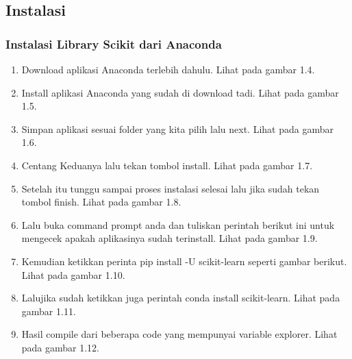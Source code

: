 \subsection{Instalasi}
\subsubsection{Instalasi Library Scikit dari Anaconda}
\begin{enumerate}
\item Download aplikasi Anaconda terlebih dahulu. Lihat pada gambar 1.4.
\item Install aplikasi Anaconda yang sudah di download tadi. Lihat pada gambar 1.5.
\item Simpan aplikasi sesuai folder yang kita pilih lalu next. Lihat pada gambar 1.6.
\item Centang Keduanya lalu tekan tombol install. Lihat pada gambar 1.7.
\item Setelah itu tunggu sampai proses instalasi selesai lalu jika sudah tekan tombol finish. Lihat pada gambar 1.8.
\item Lalu buka command prompt anda dan tuliskan perintah berikut ini untuk mengecek apakah aplikasinya sudah terinstall. Lihat pada gambar 1.9.
\item Kemudian ketikkan perinta pip install -U scikit-learn seperti gambar berikut. Lihat pada gambar 1.10.
\item Lalujika sudah  ketikkan juga perintah conda install scikit-learn. Lihat pada gambar 1.11.
\item Hasil compile dari beberapa code yang mempunyai variable explorer. Lihat pada gambar 1.12.
\end{enumerate}
